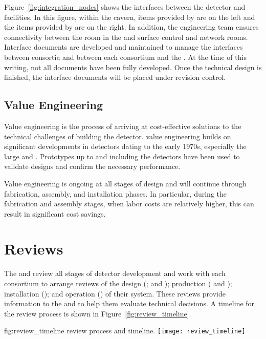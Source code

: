 Figure~\ref{fig:integration_nodes} shows the interfaces between the
detector and facilities. In this figure, within the cavern, items
provided by  are on the left and the items provided by
 are on the right. In addition, the  engineering
team ensures connectivity between the  room in the  and
surface control and network rooms.  Interface documents are developed and maintained to manage the
interfaces %
between consortia and between %
each consortium and the  . At the time of this writing, not all
documents have been fully developed. Once the technical design is
finished, the interface documents will be placed under revision
control.

\subsection{Value Engineering}
\label{sec:es-tc-fdsp-coord-ve}

Value engineering is the process of arriving at cost-effective
solutions to the technical challenges of building the 
detector.  value engineering builds on significant
developments in  detectors dating to the early 1970s,
especially the large   and
. Prototypes up to and including the  
detectors have been used to validate
 designs and confirm the necessary performance. 

Value engineering is ongoing at all stages of design and will continue
through fabrication, assembly, and installation phases. In
particular, during the fabrication and assembly stages, when labor costs
are relatively higher, this can result in significant cost savings. 

\section{Reviews}
\label{sec:es-tc-reviews}


The  and  review all stages of detector development
and work with each consortium to arrange reviews of the design
(;  and ); production (
and ); installation (); and operation
() of their system.  These reviews provide information to
the  and  to help them evaluate technical
decisions. A timeline for the review process is shown in
Figure~\ref{fig:review_timeline}.
\begin{dunefigure}{fig:review_timeline}
  { review process and timeline.}
  \texttt{[image: review\_timeline]}
\end{dunefigure}

